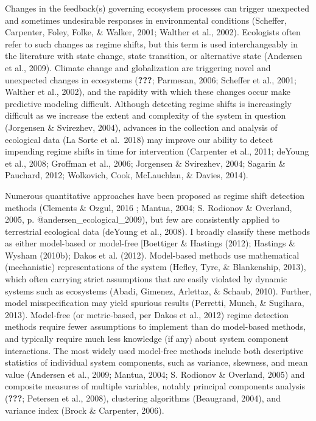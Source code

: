 \documentclass[12pt,twoside,openany]{reedthesis}
\begin{document}
Changes in the feedback(s) governing ecosystem processes can trigger unexpected and sometimes undesirable responses in environmental conditions (Scheffer, Carpenter, Foley, Folke, \& Walker, 2001; Walther et al., 2002). Ecologists often refer to such changes as regime shifts, but this term is used interchangeably in the literature with state change, state transition, or alternative state (Andersen et al., 2009). Climate change and globalization are triggering novel and unexpected changes in ecosystems ({\textbf{???}}; Parmesan, 2006; Scheffer et al., 2001; Walther et al., 2002), and the rapidity with which these changes occur make predictive modeling difficult. Although detecting regime shifts is increasingly difficult as we increase the extent and complexity of the system in question (Jorgensen \& Svirezhev, 2004), advances in the collection and analysis of ecological data (La Sorte et al.~2018) may improve our ability to detect impending regime shifts in time for intervention (Carpenter et al., 2011; deYoung et al., 2008; Groffman et al., 2006; Jorgensen \& Svirezhev, 2004; Sagarin \& Pauchard, 2012; Wolkovich, Cook, McLauchlan, \& Davies, 2014).

Numerous quantitative approaches have been proposed as regime shift detection methods (Clements \& Ozgul, 2016 ; Mantua, 2004; S. Rodionov \& Overland, 2005, p. @andersen\_ecological\_2009), but few are consistently applied to terrestrial ecological data (deYoung et al., 2008). I broadly classify these methods as either model-based or model-free {[}Boettiger \& Hastings (2012); Hastings \& Wysham (2010b); Dakos et al. (2012). Model-based methods use mathematical (mechanistic) representations of the system (Hefley, Tyre, \& Blankenship, 2013), which often carrying strict assumptions that are easily violated by dynamic systems such as ecosystems (Abadi, Gimenez, Arlettaz, \& Schaub, 2010). Further, model misspecification may yield spurious results (Perretti, Munch, \& Sugihara, 2013). Model-free (or metric-based, per Dakos et al., 2012) regime detection methods require fewer assumptions to implement than do model-based methods, and typically require much less knowledge (if any) about system component interactions. The most widely used model-free methods include both descriptive statistics of individual system components, such as variance, skewness, and mean value (Andersen et al., 2009; Mantua, 2004; S. Rodionov \& Overland, 2005) and composite measures of multiple variables, notably principal components analysis ({\textbf{???}}; Petersen et al., 2008), clustering algorithms (Beaugrand, 2004), and variance index (Brock \& Carpenter, 2006).
\end{document}

